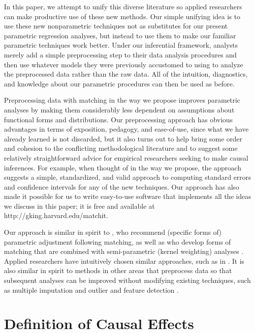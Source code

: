 \documentclass[11pt,titlepage]{article}
\begin{document}
In this paper, we attempt to unify this diverse literature so applied
researchers can make productive use of these new methods.  Our simple
unifying idea is to use these new nonparametric techniques not as
substitutes for our present parametric regression analyses, but
instead to use them to make our familiar parametric techniques work
better.  Under our inferential framework, analysts merely add a simple
preprocessing step to their data analysis procedures and then use
whatever models they were previously accustomed to using to analyze
the preprocessed data rather than the raw data.  All of the intuition,
diagnostics, and knowledge about our parametric procedures can then be
used as before.

Preprocessing data with matching in the way we propose improves
parametric analyses by making them considerably less dependent on
assumptions about functional forms and distributions.  Our
preprocessing approach has obvious advantages in terms of exposition,
pedagogy, and ease-of-use, since what we have already learned is not
discarded, but it also turns out to help bring some order and cohesion
to the conflicting methodological literature and to suggest some
relatively straightforward advice for empirical researchers seeking to
make causal inferences.  For example, when thought of in the way we
propose, the approach suggests a simple, standardized, and valid
approach to computing standard errors and confidence intervals for any
of the new techniques.  Our approach has also made it possible for us
to write easy-to-use software that implements all the ideas we discuss
in this paper; it is free and available at
http://gking.harvard.edu/matchit.

Our approach is similar in spirit to \citet{AbaImb04,RubTho00}, who
recommend (specific forms of) parametric adjustment following
matching, as well as \citet{HecIchTod98} who develop forms of matching
that are combined with semi-parametric (kernel weighting) analyses
\citep[see also][]{RosRub84a,ImaDyk03}.  Applied researchers have
intuitively chosen similar approaches, such as in \citet{Rosenbaum86,
  GlaLevMye03}.  It is also similar in spirit to methods in other
areas that preprocess data so that subsequent analyses can be improved
without modifying existing techniques, such as multiple imputation
\citep{Rubin87,KinHonJos01} and outlier and feature detection
\citep[][Ch.8]{Bishop95}.

\section{Definition of Causal Effects}
\end{document}
